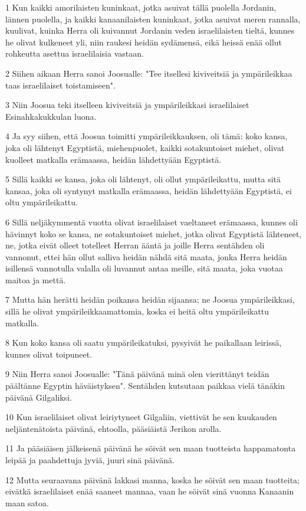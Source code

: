 \par 1 Kun kaikki amorilaisten kuninkaat, jotka asuivat tällä puolella Jordanin, lännen puolella, ja kaikki kanaanilaisten kuninkaat, jotka asuivat meren rannalla, kuulivat, kuinka Herra oli kuivannut Jordanin veden israelilaisten tieltä, kunnes he olivat kulkeneet yli, niin raukesi heidän sydämensä, eikä heissä enää ollut rohkeutta asettua israelilaisia vastaan.
\par 2 Siihen aikaan Herra sanoi Joosualle: "Tee itsellesi kiviveitsiä ja ympärileikkaa taas israelilaiset toistamiseen".
\par 3 Niin Joosua teki itselleen kiviveitsiä ja ympärileikkasi israelilaiset Esinahkakukkulan luona.
\par 4 Ja syy siihen, että Joosua toimitti ympärileikkauksen, oli tämä: koko kansa, joka oli lähtenyt Egyptistä, miehenpuolet, kaikki sotakuntoiset miehet, olivat kuolleet matkalla erämaassa, heidän lähdettyään Egyptistä.
\par 5 Sillä kaikki se kansa, joka oli lähtenyt, oli ollut ympärileikattu, mutta sitä kansaa, joka oli syntynyt matkalla erämaassa, heidän lähdettyään Egyptistä, ei oltu ympärileikattu.
\par 6 Sillä neljäkymmentä vuotta olivat israelilaiset vaeltaneet erämaassa, kunnes oli hävinnyt koko se kansa, ne sotakuntoiset miehet, jotka olivat Egyptistä lähteneet, ne, jotka eivät olleet totelleet Herran ääntä ja joille Herra sentähden oli vannonut, ettei hän ollut salliva heidän nähdä sitä maata, jonka Herra heidän isillensä vannotulla valalla oli luvannut antaa meille, sitä maata, joka vuotaa maitoa ja mettä.
\par 7 Mutta hän herätti heidän poikansa heidän sijaansa; ne Joosua ympärileikkasi, sillä he olivat ympärileikkaamattomia, koska ei heitä oltu ympärileikattu matkalla.
\par 8 Kun koko kansa oli saatu ympärileikatuksi, pysyivät he paikallaan leirissä, kunnes olivat toipuneet.
\par 9 Niin Herra sanoi Joosualle: "Tänä päivänä minä olen vierittänyt teidän päältänne Egyptin häväistyksen". Sentähden kutsutaan paikkaa vielä tänäkin päivänä Gilgaliksi.
\par 10 Kun israelilaiset olivat leiriytyneet Gilgaliin, viettivät he sen kuukauden neljäntenätoista päivänä, ehtoolla, pääsiäistä Jerikon arolla.
\par 11 Ja pääsiäisen jälkeisenä päivänä he söivät sen maan tuotteista happamatonta leipää ja paahdettuja jyviä, juuri sinä päivänä.
\par 12 Mutta seuraavana päivänä lakkasi manna, koska he söivät sen maan tuotteita; eivätkä israelilaiset enää saaneet mannaa, vaan he söivät sinä vuonna Kanaanin maan satoa.
